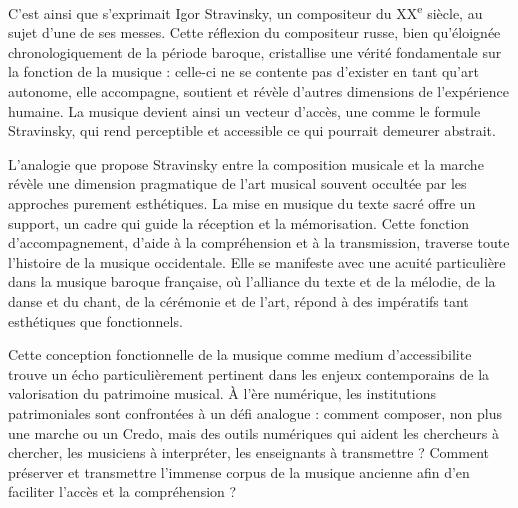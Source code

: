 \begin{quotation}
	\textit{}
\end{quotation}

C'est ainsi que s'exprimait Igor Stravinsky, un compositeur du XX\textsuperscript{e} siècle, au sujet d'une de ses messes. Cette réflexion du compositeur russe, bien qu'éloignée chronologiquement de la période baroque, cristallise une vérité fondamentale sur la fonction de la musique : celle-ci ne se contente pas d'exister en tant qu'art autonome, elle accompagne, soutient et révèle d'autres dimensions de l'expérience humaine. La musique devient ainsi un vecteur d'accès, une  comme le formule Stravinsky, qui rend perceptible et accessible ce qui pourrait demeurer abstrait.

L'analogie que propose Stravinsky entre la composition musicale et la marche révèle une dimension pragmatique de l'art musical souvent occultée par les approches purement esthétiques. La mise en musique du texte sacré offre un support, un cadre qui guide la réception et la mémorisation. Cette fonction d'accompagnement, d'aide à la compréhension et à la transmission, traverse toute l'histoire de la musique occidentale. Elle se manifeste avec une acuité particulière dans la musique baroque française, où l'alliance du texte et de la mélodie, de la danse et du chant, de la cérémonie et de l'art, répond à des impératifs tant esthétiques que fonctionnels.

Cette conception fonctionnelle de la musique comme medium d'\gls{accessibilite} trouve un écho particulièrement pertinent dans les enjeux contemporains de la valorisation du patrimoine musical. À l'ère numérique, les institutions patrimoniales sont confrontées à un défi analogue : comment composer, non plus une marche ou un Credo, mais des outils numériques qui aident les chercheurs à chercher, les musiciens à interpréter, les enseignants à transmettre ? Comment préserver et transmettre l'immense corpus de la musique ancienne afin d'en faciliter l'accès et la compréhension ?

